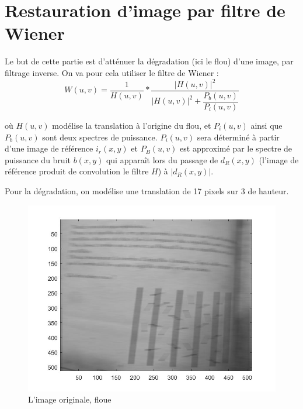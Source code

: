 \documentclass[10pt,a4paper]{article}
\begin{document}
\section{Restauration d'image par filtre de Wiener}
Le but de cette partie est d'atténuer la dégradation (ici le flou) d'une image, par filtrage inverse. On va pour cela utiliser le filtre de Wiener : 
\[
	W(u,v) = \frac{1}{H(u,v)} * \frac{|H(u,v)|^2}{|H(u,v)|^2+\dfrac{P_b(u,v)}{P_i (u,v)}}	
\]

où $H(u,v)$ modélise la translation à l'origine du flou, et $P_i(u,v)$ ainsi que $P_b(u,v)$ sont deux spectres de puissance. $P_i(u,v)$ sera déterminé à partir d'une image de référence $i_r(x,y)$ et $P_B(u,v)$ est approximé par le spectre de puissance du bruit $b(x,y)$ qui apparaît lors du passage de $d_R(x,y)$ (l'image de référence produit de convolution le filtre $H$) à $|d_R(x,y)|$.

Pour la dégradation, on modélise une translation de 17 pixels sur 3 de hauteur.


\begin{figure}[H]	\begin{center}
\includegraphics[scale=0.35]{im_floue.jpg}
\caption{L'image originale, floue}
\label{XX}
\end{center}	\end{figure}
\end{document}
